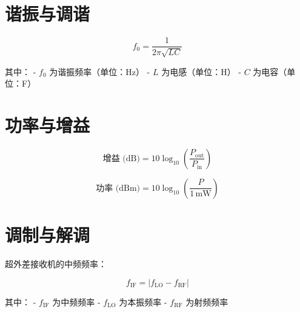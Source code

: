 \section{谐振与调谐}

\begin{equation}
    f_0 = \frac{1}{2\pi\sqrt{LC}}
    \label{eq:resonant_frequency}
\end{equation}

其中：
- \( f_0 \) 为谐振频率（单位：Hz）
- \( L \) 为电感（单位：H）
- \( C \) 为电容（单位：F）

\section{功率与增益}

\begin{equation}
    \text{增益 (dB)} = 10 \log_{10}\left(\frac{P_{\text{out}}}{P_{\text{in}}}\right)
    \label{eq:gain_dB}
\end{equation}

\begin{equation}
    \text{功率 (dBm)} = 10 \log_{10}\left(\frac{P}{1 \, \text{mW}}\right)
    \label{eq:power_dBm}
\end{equation}

\section{调制与解调}

超外差接收机的中频频率：

\begin{equation}
    f_{\text{IF}} = |f_{\text{LO}} - f_{\text{RF}}|
    \label{eq:IF_frequency}
\end{equation}

其中：
- \( f_{\text{IF}} \) 为中频频率
- \( f_{\text{LO}} \) 为本振频率
- \( f_{\text{RF}} \) 为射频频率
